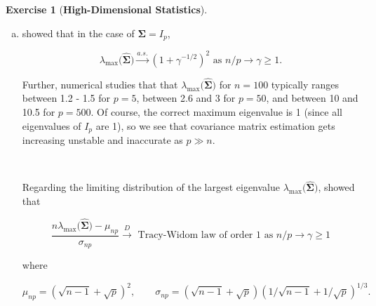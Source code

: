 \documentclass{article}
\theoremstyle{definition}
\newtheorem{exercise}{Exercise}
\theoremstyle{definition}
\theoremstyle{definition}
\theoremstyle{definition}
\begin{document}
\begin{exercise}[\textbf{High-Dimensional Statistics}]
\begin{enumerate}[(a)]
\begin{enumerate}[(1)]
\end{enumerate}


\item 


\citet{Geman1980} showed that in the case of \(\boldsymbol{\Sigma} = I_p\),

\[
\lambda_{\text{max}} \big( \widehat{\boldsymbol{\Sigma}}  \big) \xrightarrow{a.s.} (1 + \gamma^{-1/2})^2 \text{ as } n/p \to \gamma \geq 1.
\]

Further, numerical studies that that \(\lambda_{\text{max}} \big( \widehat{\boldsymbol{\Sigma}}  \big) \) for \(n = 100\) typically ranges between 1.2 - 1.5 for \(p=5\), between 2.6 and 3 for \(p=50\), and between 10 and 10.5 for \(p = 500\). Of course, the correct maximum eigenvalue is 1 (since all eigenvalues of \( I_p\) are 1), so we see that covariance matrix estimation gets increasing unstable and inaccurate as \(p \gg n\). 

\

Regarding the limiting distribution of the largest eigenvalue \(\lambda_{\text{max}} \big( \widehat{\boldsymbol{\Sigma}}  \big)\), \citet{Johnstone2001} showed that

\[
\frac{n\lambda_{\text{max}} \big( \widehat{\boldsymbol{\Sigma}}  \big)  - \mu_{np} }{\sigma_{np}} \xrightarrow{D} \text{ Tracy-Widom law of order 1 as } n/p \to \gamma \geq 1
\]

where 

\[
\mu_{np} = ( \sqrt{n-1} + \sqrt{p})^2, \qquad \sigma_{np} = ( \sqrt{n-1} + \sqrt{p})(1/\sqrt{n-1} + 1/\sqrt{p})^{1/3}.
\]

\end{enumerate} 

\end{exercise}




\end{document}
